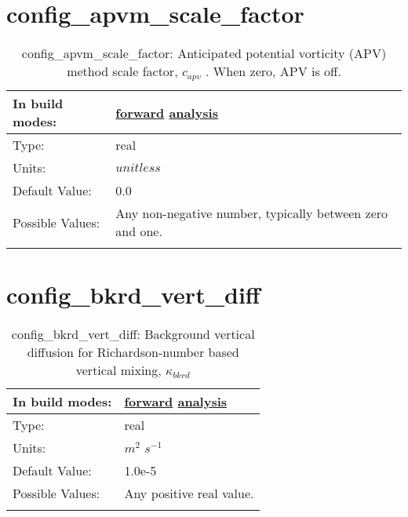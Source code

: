 \section[config\_apvm\_scale\_factor]{config\_apvm\_scale\_factor}
\label{sec:nm_sec_config_apvm_scale_factor}
\begin{center}
\begin{longtable}{| p{2.0in} || p{4.0in} |}
    \hline
    In build modes: & \hyperref[subsec:forward_nm_tab_hmix]{forward} \hyperref[subsec:analysis_nm_tab_hmix]{analysis} \\
    \hline
    Type: & real \\
    \hline
    Units: & $unitless$ \\
    \hline
    Default Value: & 0.0 \\
    \hline
    Possible Values: & Any non-negative number, typically between zero and one. \\
    \hline
    \caption{config\_apvm\_scale\_factor:  Anticipated potential vorticity (APV) method scale factor,  $c_{apv}$ .  When zero, APV is off.}
\end{longtable}
\end{center}
\section[config\_bkrd\_vert\_diff]{config\_bkrd\_vert\_diff}
\label{sec:nm_sec_config_bkrd_vert_diff}
\begin{center}
\begin{longtable}{| p{2.0in} || p{4.0in} |}
    \hline
    In build modes: & \hyperref[subsec:forward_nm_tab_vmix_rich]{forward} \hyperref[subsec:analysis_nm_tab_vmix_rich]{analysis} \\
    \hline
    Type: & real \\
    \hline
    Units: & $m^2$ $s^{-1}$ \\
    \hline
    Default Value: & 1.0e-5 \\
    \hline
    Possible Values: & Any positive real value. \\
    \hline
    \caption{config\_bkrd\_vert\_diff:  Background vertical diffusion for Richardson-number based vertical mixing,  $\kappa_{bkrd}$ }
\end{longtable}
\end{center}
